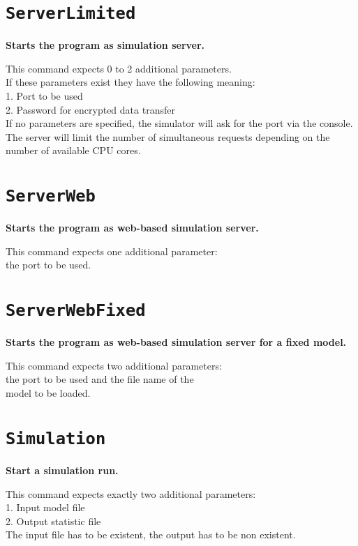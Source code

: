 \section{\texttt{ServerLimited}}

\textbf{Starts the program as simulation server.}

This command expects 0 to 2 additional parameters.\\
If these parameters exist they have the following meaning:\\
1. Port to be used\\
2. Password for encrypted data transfer\\
If no parameters are specified, the simulator will ask for the port via the console.\\
The server will limit the number of simultaneous requests depending on the\\
number of available CPU cores.

\section{\texttt{ServerWeb}}

\textbf{Starts the program as web-based simulation server.}

This command expects one additional parameter:\\
the port to be used.

\section{\texttt{ServerWebFixed}}

\textbf{Starts the program as web-based simulation server for a fixed model.}

This command expects two additional parameters:\\
the port to be used and the file name of the\\
model to be loaded.

\section{\texttt{Simulation}}

\textbf{Start a simulation run.}

This command expects exactly two additional parameters:\\
1. Input model file\\
2. Output statistic file\\
The input file has to be existent, the output has to be non existent.

